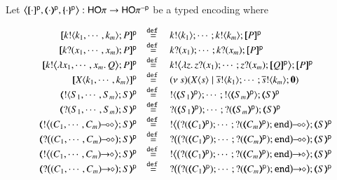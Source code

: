 \begin{definition}\label{d:enc:poltomon}
Let 
$\enco{\map{\cdot}^{\mathsf{p}}, \mapt{\cdot}^{\mathsf{p}}, \mapa{\cdot}^{\mathsf{p}}}: \HOp \to \HOp^{-\mathsf{p}}$
be a typed encoding where
\begin{figure}[t]
\[
	\begin{array}{rcl}
		\map{\bout{k}{k_1, \cdots, k_m} P}^{\mathsf{p}}
		&\defeq&
		\bout{k}{k_1} \cdots ;  \bout{k}{k_m} \map{P}^{\mathsf{p}}
		\\
			\map{\binp{k}{x_1, \cdots, x_m} P}^{\mathsf{p}}
		&\defeq&
		\binp{k}{x_1} \cdots ; \binp{k}{x_m}  \map{P}^{\mathsf{p}}
		\\
		\map{\bbout{k}{\abs{x_1, \cdots, x_m} Q} P}^{\mathsf{p}}
		&\defeq&
		\bbout{k}{\abs{z}\binp{z}{x_1} \cdots ; \binp{z}{x_m} \map{Q}^{\mathsf{p}}} \map{P}^{\mathsf{p}}
		\\ 
		\map{\appl{X}{k_1, \cdots, k_m}}^{\mathsf{p}}
		&\defeq&
		\newsp{s}{\appl{X}{s} \Par \bout{\dual{s}}{k_1} \cdots ; \bout{\dual{s}}{k_m} \inact} 
        \\ %
		\tmap{\btout{S_1, \cdots, S_m}S}{\mathsf{p}}
		&\defeq&
		\btout{\tmap{S_1}{\mathsf{p}}} \cdots ; \btout{\tmap{S_m}{\mathsf{p}}}\tmap{S}{\mathsf{p}}
		\\
		\tmap{\btinp{S_1, \cdots, S_m}S}{\mathsf{p}}
		&\defeq&
		\btinp{\tmap{S_1}{\mathsf{p}}} \cdots ; \btinp{\tmap{S_m}{\mathsf{p}}}\tmap{S}{\mathsf{p}}
		\\
		\tmap{\bbtout{\lhot{(C_1, \cdots, C_m)}} S}{\mathsf{p}}
		&\defeq&
		\bbtout{
		\lhot{\big(\btinp{\tmap{C_1}{\mathsf{p}}} \cdots ;\btinp{\tmap{C_m}{\mathsf{p}}}\tinact\big)}}\mapt{S}^{\mathsf{p}}
		\\
		\tmap{\bbtinp{\lhot{(C_1, \cdots, C_m)}} S}{\mathsf{p}}
		&\defeq&
		\bbtinp{
		\lhot{\big(\btinp{\tmap{C_1}{\mathsf{p}}} \cdots; \btinp{\tmap{C_m}{\mathsf{p}}}\tinact\big)}}\mapt{S}^{\mathsf{p}}
		\\
		\tmap{\bbtout{\shot{(C_1, \cdots, C_m)}} S}{\mathsf{p}}
		&\defeq&
		\bbtout{
		\shot{\big(\btinp{\tmap{C_1}{\mathsf{p}}} \cdots; \btinp{\tmap{C_m}{\mathsf{p}}}\tinact\big)}}\mapt{S}^{\mathsf{p}}
		\\
		\tmap{\bbtinp{\shot{(C_1, \cdots, C_m)}} S}{\mathsf{p}}
		&\defeq&
		\bbtinp{
		\shot{\big(\btinp{\tmap{C_1}{\mathsf{p}}} \cdots; \btinp{\tmap{C_m}{\mathsf{p}}}\tinact\big)}}\mapt{S}^{\mathsf{p}}

\end{array}\]
\end{figure}
\end{definition}

